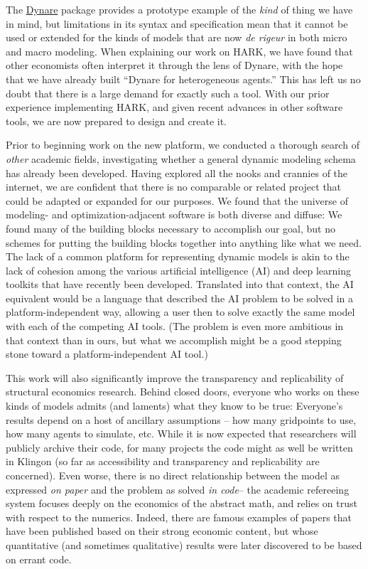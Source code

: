 \documentclass[11pt,pdftex,letterpaper]{article}
\begin{document}
The \href{https://www.dynare.org/}{Dynare} package provides a prototype example of the \textit{kind} of thing we have in mind, but limitations in its syntax and specification mean that it cannot be used or extended for the kinds of models that are now \textit{de rigeur} in both micro and macro modeling.  When explaining our work on HARK, we have found that other economists often interpret it through the lens of Dynare, with the hope that we have already built ``Dynare for heterogeneous agents.'' This has left us no doubt that there is a large demand for exactly such a tool. With our prior experience implementing HARK, and given recent advances in other software tools, we are now prepared to design and create it.

Prior to beginning work on the new platform, we conducted a thorough search of \textit{other} academic fields, investigating whether a general dynamic modeling schema has already been developed. Having explored all the nooks and crannies of the internet, we are confident that there is no comparable or related project that could be adapted or expanded for our purposes. We found that the universe of modeling- and optimization-adjacent software is both diverse and diffuse: We found many of the building blocks necessary to accomplish our goal, but no schemes for putting the building blocks together into anything like what we need. The lack of a common platform for representing dynamic models is akin to the lack of cohesion among the various artificial intelligence (AI) and deep learning toolkits that have recently been developed. Translated into that context, the AI equivalent would be a language that described the AI problem to be solved in a platform-independent way, allowing a user then to solve exactly the same model with each of the competing AI tools.  (The problem is even more ambitious in that context than in ours, but what we accomplish might be a good stepping stone toward a platform-independent AI tool.)

This work will also significantly improve the transparency and replicability of structural economics research. Behind closed doors, everyone who works on these kinds of models admits (and laments) what they know to be true: Everyone's results depend on a host of ancillary assumptions -- how many gridpoints to use, how many agents to simulate, etc.  While it is now expected that researchers will publicly archive their code, for many projects the code might as well be written in Klingon (so far as accessibility and transparency and replicability are concerned).  Even worse, there is no direct relationship between the model as expressed \textit{on paper} and the problem as solved \textit{in code}-- the academic refereeing system focuses deeply on the economics of the abstract math, and relies on trust with respect to the numerics. Indeed, there are famous examples of papers that have been published based on their strong economic content, but whose quantitative (and sometimes qualitative) results were later discovered to be based on errant code.
\end{document}
